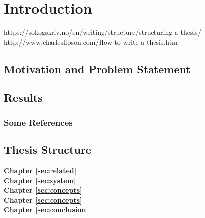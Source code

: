 %
\chapter{Introduction}
\label{sec:intro}


https://sokogskriv.no/en/writing/structure/structuring-a-thesis/
http://www.charleslipson.com/How-to-write-a-thesis.htm

\section{Motivation and Problem Statement}
\label{sec:intro:motivation}
\cite{Jurgens:2000,Jurgens:1995,Miede:2011,Kohm:2011,Apple:keynote:2010,Apple:numbers:2010,Apple:pages:2010}

\section{Results}
\label{sec:intro:results}

\subsection{Some References}
\label{sec:intro:results:refs}
\cite{WEB:GNU:GPL:2010,WEB:Miede:2011}

\section{Thesis Structure}
\label{sec:intro:structure}

\textbf{Chapter \ref{sec:related}} \\[0.2em]

\textbf{Chapter \ref{sec:system}} \\[0.2em]

\textbf{Chapter \ref{sec:concepts}} \\[0.2em]

\textbf{Chapter \ref{sec:concepts}} \\[0.2em]

\textbf{Chapter \ref{sec:conclusion}} \\[0.2em]
